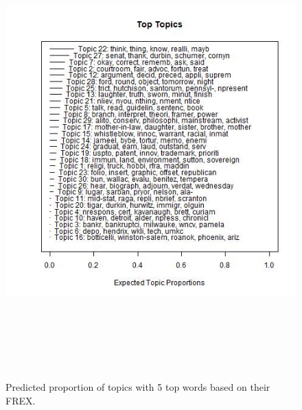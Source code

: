 \documentclass [12pt]{article}
\begin{document}
\begin{figure}[H]
    \centering
    \includegraphics[height = 175mm, width = 175mm]{../tables_figures/stm_poc_frex.jpg}
    \caption{Predicted proportion of topics with 5 top words based on their FREX.}
    \label{fig:frex_poc}
\end{figure}
\end{document}

